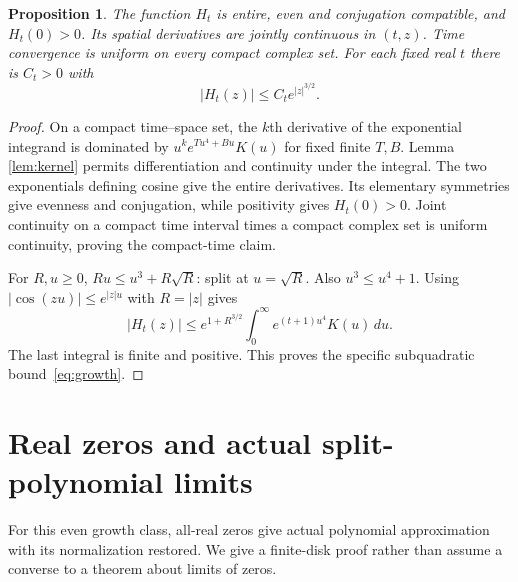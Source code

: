 \documentclass[11pt]{article}
\newtheorem{proposition}[theorem]{Proposition}
\theoremstyle{remark}\newtheorem{remark}[theorem]{Remark}
\begin{document}
\begin{proposition}\label{prop:entire}
The function $H_t$ is entire, even and conjugation compatible,
and $H_t(0)>0$. Its spatial derivatives are jointly continuous
in $(t,z)$. Time convergence is uniform on every compact
complex set. For each fixed real $t$ there is $C_t>0$ with
\begin{equation}\label{eq:growth}
 |H_t(z)|\leq C_t e^{|z|^{3/2}}.
\end{equation}
\end{proposition}
\begin{proof}
On a compact time--space set, the $k$th derivative of the
exponential integrand is dominated by
$u^ke^{Tu^4+Bu}K(u)$ for fixed finite $T,B$. Lemma
\ref{lem:kernel} permits differentiation and continuity under
the integral. The two exponentials defining cosine give the
entire derivatives. Its elementary symmetries give evenness
and conjugation, while positivity gives $H_t(0)>0$.
Joint continuity on a compact time interval times a compact
complex set is uniform continuity, proving the compact-time claim.

For $R,u\geq0$, $Ru\leq u^3+R\sqrt R$: split at
$u=\sqrt R$. Also $u^3\leq u^4+1$. Using
$|\cos(zu)|\leq e^{|z|u}$ with $R=|z|$ gives
\[
 |H_t(z)|\leq e^{1+R^{3/2}}
                    \int_0^\infty e^{(t+1)u^4}K(u)\,du.
\]
The last integral is finite and positive. This proves the
specific subquadratic bound~\eqref{eq:growth}.
\end{proof}

\section{Real zeros and actual split-polynomial limits}
For this even growth class, all-real zeros give actual
polynomial approximation with its normalization restored.
We give a finite-disk proof rather than assume a converse
to a theorem about limits of zeros.
\end{document}
